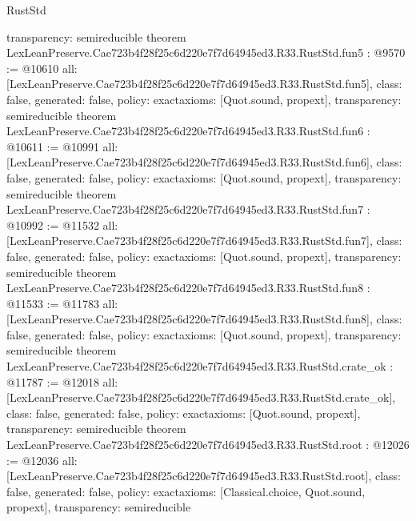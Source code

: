 \begin{lexlean}{RustStd}
\begin{coremodule}
{  transparency: semireducible
}
theorem LexLeanPreserve.Cae723b4f28f25c6d220e7f7d64945ed3.R33.RustStd.fun5 : @9570 := @10610 {
  all: [LexLeanPreserve.Cae723b4f28f25c6d220e7f7d64945ed3.R33.RustStd.fun5],
  class: false,
  generated: false,
  policy: exact{axioms: [Quot.sound, propext]},
  transparency: semireducible
}
theorem LexLeanPreserve.Cae723b4f28f25c6d220e7f7d64945ed3.R33.RustStd.fun6 : @10611 := @10991 {
  all: [LexLeanPreserve.Cae723b4f28f25c6d220e7f7d64945ed3.R33.RustStd.fun6],
  class: false,
  generated: false,
  policy: exact{axioms: [Quot.sound, propext]},
  transparency: semireducible
}
theorem LexLeanPreserve.Cae723b4f28f25c6d220e7f7d64945ed3.R33.RustStd.fun7 : @10992 := @11532 {
  all: [LexLeanPreserve.Cae723b4f28f25c6d220e7f7d64945ed3.R33.RustStd.fun7],
  class: false,
  generated: false,
  policy: exact{axioms: [Quot.sound, propext]},
  transparency: semireducible
}
theorem LexLeanPreserve.Cae723b4f28f25c6d220e7f7d64945ed3.R33.RustStd.fun8 : @11533 := @11783 {
  all: [LexLeanPreserve.Cae723b4f28f25c6d220e7f7d64945ed3.R33.RustStd.fun8],
  class: false,
  generated: false,
  policy: exact{axioms: [Quot.sound, propext]},
  transparency: semireducible
}
theorem LexLeanPreserve.Cae723b4f28f25c6d220e7f7d64945ed3.R33.RustStd.crate_ok : @11787 := @12018 {
  all: [LexLeanPreserve.Cae723b4f28f25c6d220e7f7d64945ed3.R33.RustStd.crate_ok],
  class: false,
  generated: false,
  policy: exact{axioms: [Quot.sound, propext]},
  transparency: semireducible
}
theorem LexLeanPreserve.Cae723b4f28f25c6d220e7f7d64945ed3.R33.RustStd.root : @12026 := @12036 {
  all: [LexLeanPreserve.Cae723b4f28f25c6d220e7f7d64945ed3.R33.RustStd.root],
  class: false,
  generated: false,
  policy: exact{axioms: [Classical.choice, Quot.sound, propext]},
  transparency: semireducible
}


\end{coremodule}
\end{lexlean}
